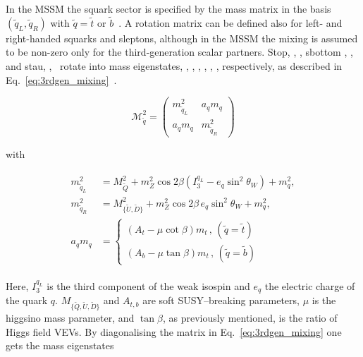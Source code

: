 				In the \ac{MSSM} the squark sector is specified by the mass matrix in the basis $(\tilde{q}_L, \tilde{q}_R)$ with $\tilde{q} = \tilde{t}$ or $\tilde{b}$~\cite{Haber:1984rc}. A rotation matrix can be defined also for left- and right-handed squarks and sleptons, although in the \ac{MSSM} the mixing is assumed to be non-zero only for the third-generation scalar partners. Stop, \stopL, \stopR, sbottom \sbottomL, \sbottomR, and stau, \stauL, \stauR\ rotate into mass eigenstates, \stopone, \stoptwo, \sbottomone, \sbottomtwo, \stauone, \stautwo, respectively, as described in Eq.~\ref{eq:3rdgen_mixing}~\cite{Hidaka:2000cm}. %

				\begin{equation}
				\label{eq:3rdgen_mixing}
					\mathcal {M}_{\tilde{q}}^2 = 
					\begin{pmatrix}
						m_{\tilde{q}_L}^2 & a_q m_q \\
						a_q m_q & m_{\tilde{q}_R}^2
					\end{pmatrix}
				\end{equation}

				\noindent with 

				\begin{align}
				\label{eq:msqL}
					\begin{split}
						m_{\tilde{q}_L}^2 & = M_{\tilde{Q}}^2 + m_Z^2 \cos 2\beta \left ( I_3^{q_L} - e_q \sin^2 \theta_W \right ) + m_q^2 ,
						\\ 
						m_{\tilde{q}_R}^2 & = M_{{\{ \tilde{U},\tilde{D} \}}}^2 + m_Z^2 \cos 2\beta\, e_q \sin^2 \theta_W  + m_q^2 , 
						\\
						a_q m_q & = 
						\begin{cases}
							\left ( A_t - \mu \cot \beta \right ) m_t\, , \, (\tilde{q} = \tilde{t}) \\  
							\left ( A_b - \mu \tan \beta \right ) m_t\, , \, (\tilde{q} = \tilde{b})  
						\end{cases}
					\end{split}
				\end{align}

				\noindent Here, $I_3^{q_L}$ is the third component of the weak isospin and $e_q$ the electric charge of the quark $q$. $M_{{\{ \tilde{Q},\tilde{U},\tilde{D} \}}}$ and $A_{t,b}$ are soft \ac{SUSY}–breaking parameters, $\mu$ is the higgsino mass parameter, and $\tan \beta$, as previously mentioned, is the ratio of Higgs field \ac{VEV}s. By diagonalising the matrix in Eq.~\ref{eq:3rdgen_mixing} one gets the mass eigenstates 
				
